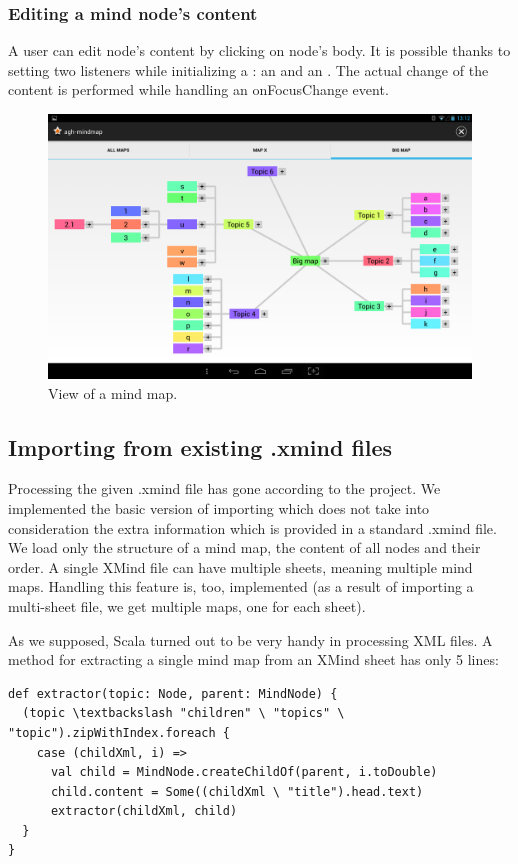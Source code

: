 \subsubsection{Editing a mind node's content}
\label{subsubsec:delete-node}
A user can edit node's content by clicking on node's body. It is possible thanks to setting two listeners while initializing a : an  and an . The actual change of the content is performed while handling an onFocusChange event.

\begin{figure}[h]
	\centering
	\includegraphics[width=\textwidth]{graphics-screenshot-big-map}
	\caption{View of a mind map.}
	\label{fig:screen-map}
\end{figure}

\subsection{Importing from existing .xmind files}
\label{subsec:import}
Processing the given .xmind file has gone according to the project. We implemented the basic version of importing which does not take into consideration the extra information which is provided in a standard .xmind file. We load only the structure of a mind map, the content of all nodes and their order. A single XMind file can have multiple sheets, meaning multiple mind maps. Handling this feature is, too, implemented (as a result of importing a multi-sheet file, we get multiple maps, one for each sheet).

As we supposed, Scala turned out to be very handy in processing XML files. A method for extracting a single mind map from an XMind sheet has only 5 lines:
\begin{verbatim}
def extractor(topic: Node, parent: MindNode) {
  (topic \textbackslash "children" \ "topics" \ "topic").zipWithIndex.foreach {
    case (childXml, i) =>
      val child = MindNode.createChildOf(parent, i.toDouble)
      child.content = Some((childXml \ "title").head.text)
      extractor(childXml, child)
  }
}\end{verbatim}

